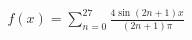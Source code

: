 \documentclass[preview]{standalone}
\begin{document}
\begin{align*}
f(x) = \sum_{n=0}^27 \frac{4 \sin (2n + 1)x }{ (2n + 1) \pi}
\end{align*}
\end{document}
